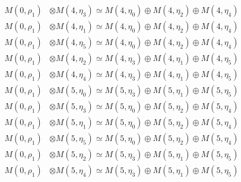 \begin{align*}
M(0,\rho_{1}) &\otimes M(4,\eta_{3}) \simeq M(4,\eta_{0}) \oplus M(4,\eta_{2}) \oplus M(4,\eta_{4})\\
M(0,\rho_{1}) &\otimes M(4,\eta_{1}) \simeq M(4,\eta_{0}) \oplus M(4,\eta_{2}) \oplus M(4,\eta_{4})\\
M(0,\rho_{1}) &\otimes M(4,\eta_{5}) \simeq M(4,\eta_{0}) \oplus M(4,\eta_{2}) \oplus M(4,\eta_{4})\\
M(0,\rho_{1}) &\otimes M(4,\eta_{2}) \simeq M(4,\eta_{3}) \oplus M(4,\eta_{1}) \oplus M(4,\eta_{5})\\
M(0,\rho_{1}) &\otimes M(4,\eta_{4}) \simeq M(4,\eta_{3}) \oplus M(4,\eta_{1}) \oplus M(4,\eta_{5})\\
M(0,\rho_{1}) &\otimes M(5,\eta_{0}) \simeq M(5,\eta_{3}) \oplus M(5,\eta_{1}) \oplus M(5,\eta_{5})\\
M(0,\rho_{1}) &\otimes M(5,\eta_{3}) \simeq M(5,\eta_{0}) \oplus M(5,\eta_{2}) \oplus M(5,\eta_{4})\\
M(0,\rho_{1}) &\otimes M(5,\eta_{1}) \simeq M(5,\eta_{0}) \oplus M(5,\eta_{2}) \oplus M(5,\eta_{4})\\
M(0,\rho_{1}) &\otimes M(5,\eta_{5}) \simeq M(5,\eta_{0}) \oplus M(5,\eta_{2}) \oplus M(5,\eta_{4})\\
M(0,\rho_{1}) &\otimes M(5,\eta_{2}) \simeq M(5,\eta_{3}) \oplus M(5,\eta_{1}) \oplus M(5,\eta_{5})\\
M(0,\rho_{1}) &\otimes M(5,\eta_{4}) \simeq M(5,\eta_{3}) \oplus M(5,\eta_{1}) \oplus M(5,\eta_{5})\\
\end{align*}

